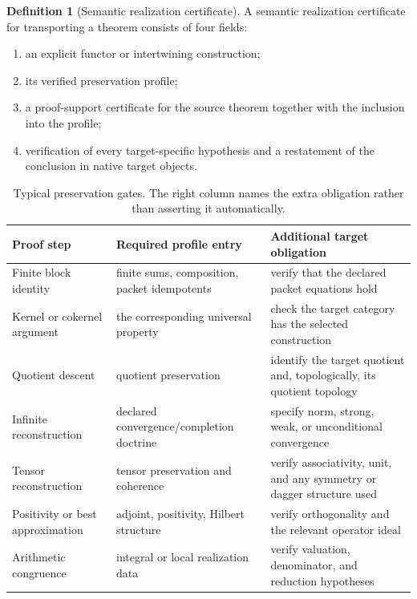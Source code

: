 \documentclass[11pt]{article}
\theoremstyle{definition}
\newtheorem{definition}[theorem]{Definition}
\theoremstyle{remark}
\begin{document}
\begin{definition}[Semantic realization certificate]
\label{def:semantic-realization-certificate}
A semantic realization certificate for transporting a theorem consists of four fields:
\begin{enumerate}[label=\textup{(C\arabic*)}]
\item an explicit functor or intertwining construction;
\item its verified preservation profile;
\item a proof-support certificate for the source theorem together with the inclusion into the profile;
\item verification of every target-specific hypothesis and a restatement of the conclusion in native target objects.
\end{enumerate}
\end{definition}

\begin{table}[htbp]
\centering
\caption{Typical preservation gates.  The right column names the extra obligation rather than asserting it automatically.}
\label{tab:preservation-gates}
\small
\begin{tabularx}{\textwidth}{@{}L{0.22\textwidth}L{0.25\textwidth}Y@{}}
\toprule
Proof step & Required profile entry & Additional target obligation\\
\midrule
Finite block identity & finite sums, composition, packet idempotents & verify that the declared packet equations hold\\
Kernel or cokernel argument & the corresponding universal property & check the target category has the selected construction\\
Quotient descent & quotient preservation & identify the target quotient and, topologically, its quotient topology\\
Infinite reconstruction & declared convergence/completion doctrine & specify norm, strong, weak, or unconditional convergence\\
Tensor reconstruction & tensor preservation and coherence & verify associativity, unit, and any symmetry or dagger structure used\\
Positivity or best approximation & adjoint, positivity, Hilbert structure & verify orthogonality and the relevant operator ideal\\
Arithmetic congruence & integral or local realization data & verify valuation, denominator, and reduction hypotheses\\
\bottomrule
\end{tabularx}
\end{table}
\end{document}
